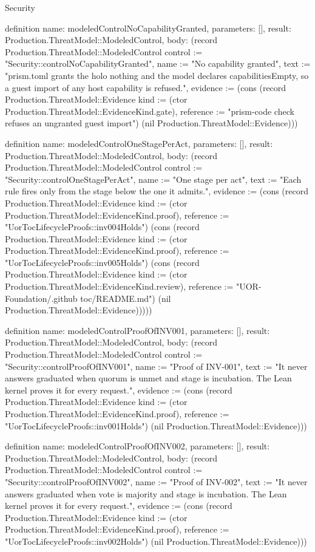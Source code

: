 \begin{lexlean}{Security}
\begin{semanticmodule}
definition{
  name: modeledControlNoCapabilityGranted,
  parameters: [],
  result: Production.ThreatModel::ModeledControl,
  body: (record Production.ThreatModel::ModeledControl {control := "Security::controlNoCapabilityGranted", name := "No capability granted", text := "prism.toml grants the holo nothing and the model declares capabilitiesEmpty, so a guest import of any host capability is refused.", evidence := (cons (record Production.ThreatModel::Evidence {kind := (ctor Production.ThreatModel::EvidenceKind.gate), reference := "prism-code check refuses an ungranted guest import"}) (nil Production.ThreatModel::Evidence))})
}

definition{
  name: modeledControlOneStagePerAct,
  parameters: [],
  result: Production.ThreatModel::ModeledControl,
  body: (record Production.ThreatModel::ModeledControl {control := "Security::controlOneStagePerAct", name := "One stage per act", text := "Each rule fires only from the stage below the one it admits.", evidence := (cons (record Production.ThreatModel::Evidence {kind := (ctor Production.ThreatModel::EvidenceKind.proof), reference := "UorTocLifecycleProofs::inv004Holds"}) (cons (record Production.ThreatModel::Evidence {kind := (ctor Production.ThreatModel::EvidenceKind.proof), reference := "UorTocLifecycleProofs::inv005Holds"}) (cons (record Production.ThreatModel::Evidence {kind := (ctor Production.ThreatModel::EvidenceKind.review), reference := "UOR-Foundation/.github toc/README.md"}) (nil Production.ThreatModel::Evidence))))})
}

definition{
  name: modeledControlProofOfINV001,
  parameters: [],
  result: Production.ThreatModel::ModeledControl,
  body: (record Production.ThreatModel::ModeledControl {control := "Security::controlProofOfINV001", name := "Proof of INV-001", text := "It never answers graduated when quorum is unmet and stage is incubation. The Lean kernel proves it for every request.", evidence := (cons (record Production.ThreatModel::Evidence {kind := (ctor Production.ThreatModel::EvidenceKind.proof), reference := "UorTocLifecycleProofs::inv001Holds"}) (nil Production.ThreatModel::Evidence))})
}

definition{
  name: modeledControlProofOfINV002,
  parameters: [],
  result: Production.ThreatModel::ModeledControl,
  body: (record Production.ThreatModel::ModeledControl {control := "Security::controlProofOfINV002", name := "Proof of INV-002", text := "It never answers graduated when vote is majority and stage is incubation. The Lean kernel proves it for every request.", evidence := (cons (record Production.ThreatModel::Evidence {kind := (ctor Production.ThreatModel::EvidenceKind.proof), reference := "UorTocLifecycleProofs::inv002Holds"}) (nil Production.ThreatModel::Evidence))})
}


\end{semanticmodule}
\end{lexlean}
